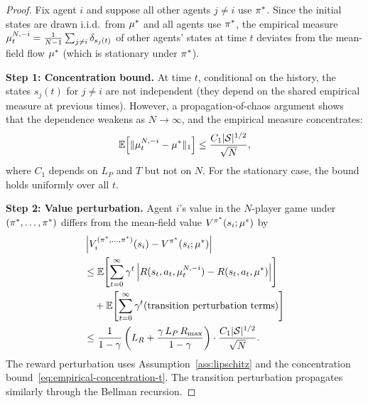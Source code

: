 \documentclass[11pt,a4paper]{article}
\begin{document}
\begin{proof}
Fix agent $i$ and suppose all other agents $j \neq i$ use $\pi^*$.
Since the initial states are drawn i.i.d.\ from $\mu^*$ and
all agents use $\pi^*$, the empirical measure $\mu^{N,-i}_t
= \frac{1}{N-1}\sum_{j \neq i} \delta_{s_j(t)}$ of other agents'
states at time $t$ deviates from the mean-field flow $\mu^*$
(which is stationary under $\pi^*$).

\textbf{Step 1: Concentration bound.}  At time $t$, conditional on
the history, the states $s_j(t)$ for $j \neq i$ are not independent
(they depend on the shared empirical measure at previous times).
However, a propagation-of-chaos argument
\citep[Chapter~4]{carmona2018i} shows that the dependence weakens
as $N \to \infty$, and the empirical measure concentrates:
\begin{equation}
\label{eq:empirical-concentration-t}
  \mathbb{E}\!\left[\|\mu^{N,-i}_t - \mu^*\|_1\right]
  \leq \frac{C_1 |\mathcal{S}|^{1/2}}{\sqrt{N}},
\end{equation}
where $C_1$ depends on $L_P$ and $T$ but not on $N$.  For the
stationary case, the bound holds uniformly over all $t$.

\textbf{Step 2: Value perturbation.}  Agent $i$'s value in the
$N$-player game under $(\pi^*, \ldots, \pi^*)$ differs from
the mean-field value $V^{\pi^*}(s_i; \mu^*)$ by
\begin{align*}
  &\left|V_i^{(\pi^*, \ldots, \pi^*)}(s_i)
    - V^{\pi^*}(s_i; \mu^*)\right| \\
  &\leq \mathbb{E}\!\left[\sum_{t=0}^{\infty} \gamma^t
    \left|R(s_t, a_t, \mu^{N,-i}_t)
    - R(s_t, a_t, \mu^*)\right|\right] \\
  &\quad + \mathbb{E}\!\left[\sum_{t=0}^{\infty} \gamma^t
    \text{(transition perturbation terms)}\right] \\
  &\leq \frac{1}{1-\gamma}\left(L_R
    + \frac{\gamma\, L_P\, R_{\max}}{1-\gamma}\right)
    \cdot \frac{C_1 |\mathcal{S}|^{1/2}}{\sqrt{N}}.
\end{align*}
The reward perturbation uses Assumption~\ref{ass:lipschitz} and
the concentration bound~\eqref{eq:empirical-concentration-t}.
The transition perturbation propagates similarly through the
Bellman recursion.


\end{proof}
\end{document}
